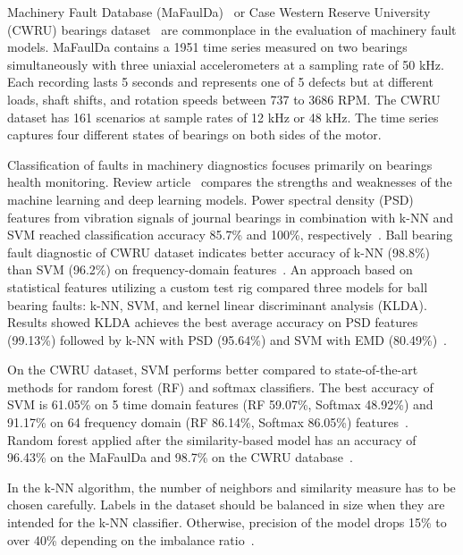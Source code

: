\documentclass{llncs}
\begin{document}
Machinery Fault Database (MaFaulDa)~\cite{mafaulda_dataset} or Case Western Reserve University (CWRU) bearings dataset~\cite{cwru_dataset} are commonplace in the evaluation of machinery fault models. MaFaulDa contains a 1951 time series measured on two bearings 
simultaneously with three uniaxial accelerometers at a sampling rate of 50 kHz. Each recording lasts 5 seconds and represents one of 5 defects but at different loads, shaft shifts, and rotation speeds between 737 to 3686 RPM. The CWRU dataset has 161 scenarios at sample rates of 12 kHz or 48 kHz. The time series captures four different states of bearings on both sides of the motor.

Classification of faults in machinery diagnostics focuses primarily on bearings health monitoring. Review article~\cite{sheng_review_2020} compares the strengths and weaknesses of the machine learning and deep learning models. Power spectral density (PSD) features from vibration signals of journal bearings in combination with k-NN and SVM reached classification accuracy 85.7\% and 100\%, respectively~\cite{moosavian_appropriate_2012}. Ball bearing fault diagnostic of CWRU dataset indicates better accuracy of k-NN (98.8\%) than SVM (96.2\%) on frequency-domain features~\cite{jamil_feature-based_2021}. An approach based on statistical features utilizing a custom test rig compared three models for ball bearing faults: k-NN, SVM, and kernel linear discriminant analysis (KLDA). Results showed KLDA achieves the best average accuracy on PSD features (99.13\%) followed by k-NN with PSD (95.64\%) and SVM with EMD (80.49\%)~\cite{altaf_new_2022}. 

On the CWRU dataset, SVM performs better compared to state-of-the-art methods for random forest (RF) and softmax classifiers. The best accuracy of SVM is 61.05\% on 5 time domain features (RF 59.07\%, Softmax 48.92\%) and 91.17\% on 64 frequency domain (RF 86.14\%, Softmax 86.05\%) features~\cite{maurya_condition-based_2021}. Random forest applied after the similarity-based model has an accuracy of 96.43\% on the MaFaulDa and 98.7\% on the CWRU database~\cite{ribeiro_rotating_2017}.

In the k-NN algorithm, the number of neighbors and similarity measure has to be chosen carefully. Labels in the dataset should be balanced in size when they are intended for the k-NN classifier. Otherwise, precision of the model drops 15\% to over 40\% depending on the imbalance ratio~\cite{shi_improving_2020}.
\end{document}
